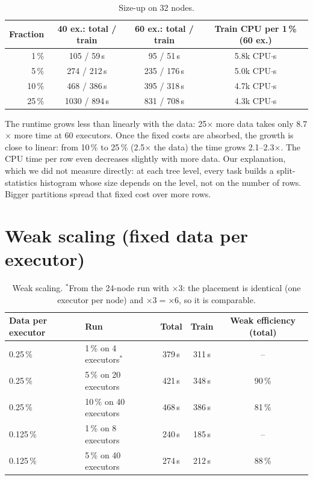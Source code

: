 \documentclass[a4paper, 11pt]{article}
\begin{document}
\begin{table}[H]
\centering
\begin{tabular}{rccc}
\toprule
Fraction & 40 ex.: total / train & 60 ex.: total / train & Train CPU per 1\,\% (60 ex.) \\
\midrule
1\,\%  & 105 / 59\,s   & 95 / 51\,s   & 5.8k CPU$\cdot$s \\
5\,\%  & 274 / 212\,s  & 235 / 176\,s & 5.0k CPU$\cdot$s \\
10\,\% & 468 / 386\,s  & 395 / 318\,s & 4.7k CPU$\cdot$s \\
25\,\% & 1030 / 894\,s & 831 / 708\,s & 4.3k CPU$\cdot$s \\
\bottomrule
\end{tabular}
\caption{Size-up on 32 nodes.}
\end{table}

The runtime grows less than linearly with the data: 25$\times$ more data takes only 8.7$\times$ more
time at 60 executors. Once the fixed costs are absorbed, the growth is close to linear: from 10\,\% to
25\,\% (2.5$\times$ the data) the time grows 2.1--2.3$\times$. The CPU time per row even decreases
slightly with more data. Our explanation, which we did not measure directly: at each tree level, every
task builds a split-statistics histogram whose size depends on the level, not on the number of rows.
Bigger partitions spread that fixed cost over more rows.

\section{Weak scaling (fixed data per executor)}

\begin{table}[H]
\centering
\begin{tabular}{llccc}
\toprule
Data per executor & Run & Total & Train & Weak efficiency (total) \\
\midrule
0.25\,\%  & 1\,\% on 4 executors$^{*}$ & 379\,s & 311\,s & -- \\
0.25\,\%  & 5\,\% on 20 executors  & 421\,s & 348\,s & 90\,\% \\
0.25\,\%  & 10\,\% on 40 executors & 468\,s & 386\,s & 81\,\% \\
\midrule
0.125\,\% & 1\,\% on 8 executors   & 240\,s & 185\,s & -- \\
0.125\,\% & 5\,\% on 40 executors  & 274\,s & 212\,s & 88\,\% \\
\bottomrule
\end{tabular}
\caption{Weak scaling. $^{*}$From the 24-node run with $\times 3$: the placement is identical (one
executor per node) and $\times 3 = \times 6$, so it is comparable.}
\end{table}
\end{document}

